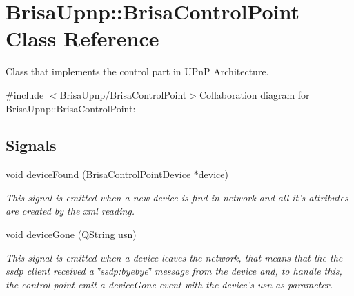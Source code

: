 \hypertarget{classBrisaUpnp_1_1BrisaControlPoint}{
\section{BrisaUpnp::BrisaControlPoint Class Reference}
\label{classBrisaUpnp_1_1BrisaControlPoint}
}


Class that implements the control part in UPnP Architecture.  


{\ttfamily \#include $<$BrisaUpnp/BrisaControlPoint$>$}Collaboration diagram for BrisaUpnp::BrisaControlPoint:\subsection*{Signals}
\begin{DoxyCompactItemize}
\item 
void \hyperlink{classBrisaUpnp_1_1BrisaControlPoint_aaef59f4a10f5e9d61eed30baba7903e3}{deviceFound} (\hyperlink{classBrisaUpnp_1_1BrisaControlPointDevice}{BrisaControlPointDevice} $\ast$device)
\begin{DoxyCompactList}\small\item\em This signal is emitted when a new device is find in network and all it's attributes are created by the xml reading. \item\end{DoxyCompactList}\item 
void \hyperlink{classBrisaUpnp_1_1BrisaControlPoint_ae60f102af98193f08977fdcf9f051ab1}{deviceGone} (QString usn)
\begin{DoxyCompactList}\small\item\em This signal is emitted when a device leaves the network, that means that the the ssdp client received a \char`\"{}ssdp:byebye\char`\"{} message from the device and, to handle this, the control point emit a deviceGone event with the device's {\itshape usn\/} as parameter. \item\end{DoxyCompactList}\end{DoxyCompactItemize}
